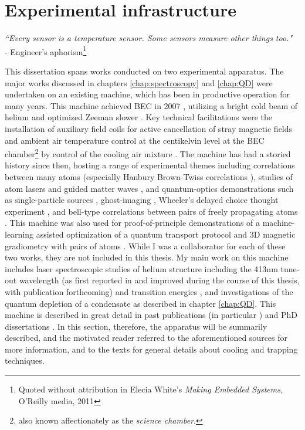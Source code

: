 
\chapter{Experimental infrastructure}
	\begin{adjustwidth}{0cm}{0cm}
	\begin{flushright}
	\emph{``Every sensor is a temperature sensor.  Some sensors measure other things too."\\} 
	- Engineer's aphorism\footnote{Quoted without attribution in Elecia White's \emph{Making Embedded Systems}, O'Reilly media, 2011}
	\end{flushright}
	\end{adjustwidth}

	This dissertation spans works conducted on two experimental apparatus. The major works discussed in chapters \ref{chap:spectroscopy} and \ref{chap:QD} were undertaken on an existing machine, which has been in productive operation for many years. This machine achieved BEC in 2007 \cite{dall07}, utilizing a bright cold beam of helium \cite{swansson04} and optimized Zeeman slower \cite{dedman04}. Key technical facilitations were the installation of auxiliary field coils for active cancellation of stray magnetic fields \cite{dedman04} and ambient air temperature control at the centikelvin level at the BEC chamber\footnote{also known affectionately as the \emph{science chamber}.} by control of the cooling air mixture \cite{dedman15}. The machine has had a storied history since then, hosting a range of experimental themes including correlations between many atoms \cite{hodgman17,dall13,manning13} (especially Hanbury Brown-Twiss correlations \cite{manning10,dall11a,hodgman11,rugway11,rugway13}), studies of atom lasers \cite{dall07,dall08a,henson18,manning10} and guided matter waves \cite{dall10, dall11a,dall11}, and quantum-optics demonstrations such as single-particle sources \cite{manning14}, ghost-imaging \cite{khakimov16,hodgman19}, Wheeler's delayed choice thought experiment \cite{manning15}, and bell-type correlations between pairs of freely propagating atoms \cite{shin19}. This machine was also used for proof-of-principle demonstrations of a machine-learning assisted optimization of a quantum transport protocol \cite{henson18ML} and 3D magnetic gradiometry with pairs of atoms \cite{shin20}. While I was a collaborator for each of these two works, they are not included in this thesis. My main work on this machine includes laser spectroscopic studies of helium structure including the 413nm tune-out wavelength (as first reported in \cite{henson15} and improved during the course of this thesis, with publication forthcoming) and transition energies \cite{ross20,thomas20}, and  investigations of the quantum depletion of a condensate as described in chapter \ref{chap:QD}. 
	This machine is described in great detail in past publications (in particular \cite{swansson04,dall07}) and PhD dissertations \cite{hodgmanthesis,manningthesis,shinthesis,dallthesis}. In this section, therefore, the apparatus will be summarily described, and the motivated reader referred to the aforementioned sources for more information, and to the texts \cite{FootAtomic,MetVdS} for general details about cooling and trapping techniques.

